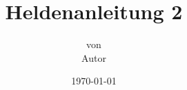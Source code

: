 \documentclass[12pt, a4paper, listof=totoc, bibliography=totoc, abstract=notoc, titlepage, captions=tableheading, cdgeometry=true, open=right, twoside=false]{scrreprt}
\begin{document}
\title{Heldenanleitung 2
\vskip 2cm
{\normalsize
}}
 
\author{{\normalsize von} \\
Autor }
 
\date{{\normalsize \today}}
 
\maketitle

    
\tableofcontents
\newpage





\end{document}
